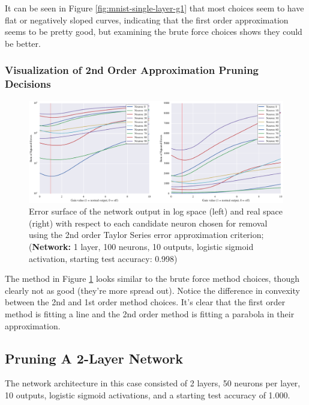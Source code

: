 It can be seen in Figure \ref{fig:mnist-single-layer-g1} that most choices seem to have flat or negatively sloped curves, indicating that the first order approximation seems to be pretty good, but examining the brute force choices shows they could be better. 

\subsubsection{Visualization of 2nd Order Approximation Pruning Decisions}
\begin{figure}[!ht]
\centering
\includegraphics[width=\linewidth]{mnist-acc99-g2-gain.pdf}
\caption{Error surface of the network output in log space (left) and real space (right) with respect to each candidate neuron chosen for removal using the 2nd order Taylor Series error approximation criterion; (\textbf{Network:} 1 layer, 100 neurons, 10 outputs, logistic sigmoid activation, starting test accuracy: 0.998)}
\label{fig:mnist-single-layer-g2}
\end{figure}

The method in Figure \ref{fig:mnist-single-layer-g2} looks similar to the brute force method choices, though clearly not as good (they're more spread out). Notice the difference in convexity between the 2nd and 1st order method choices. It's clear that the first order method is fitting a line and the 2nd order method is fitting a parabola in their approximation. 

\subsection{Pruning A 2-Layer Network}
The network architecture in this case consisted of 2 layers, 50 neurons per layer, 10 outputs, logistic sigmoid activations, and a starting test accuracy of 1.000.

